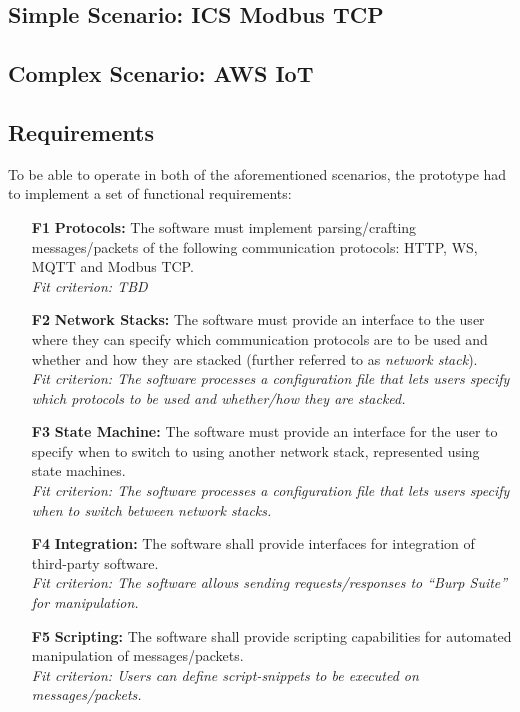 \subsection{Simple Scenario: ICS Modbus TCP}

\subsection{Complex Scenario: AWS IoT}



\subsection{Requirements}
To be able to operate in both of the aforementioned scenarios, the prototype had to implement a set of functional requirements:
\begin{itemize}
    \item [\textbf{F1}] \textbf{Protocols:} The software must implement parsing/crafting messages/packets of the following communication protocols: \ac{HTTP}, \ac{WS}, \ac{MQTT} and Modbus \ac{TCP}. \\
    \textit{Fit criterion: TBD} %
    \item [\textbf{F2}] \textbf{Network Stacks:} The software must provide an interface to the user where they can specify which communication protocols are to be used and whether and how they are stacked (further referred to as \emph{network stack}).\\
    \textit{Fit criterion: The software processes a configuration file that lets users specify which protocols to be used and whether/how they are stacked.} 
    \item [\textbf{F3}] \textbf{State Machine:} The software must provide an interface for the user to specify when to switch to using another network stack, represented using state machines.\\
    \textit{Fit criterion: The software processes a configuration file that lets users specify when to switch between network stacks.}
    \item [\textbf{F4}] \textbf{Integration:} The software shall provide interfaces for integration of third-party software.\\
    \textit{Fit criterion: The software allows sending requests/responses to \enquote{Burp Suite} for manipulation.} %
    \item [\textbf{F5}] \textbf{Scripting:} The software shall provide scripting capabilities for automated manipulation of messages/packets.\\
    \textit{Fit criterion: Users can define script-snippets to be executed on messages/packets.} %
\end{itemize}

